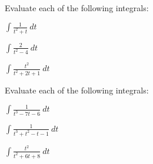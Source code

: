 \begin{problem}
  
\item Evaluate each of the following integrals:

  \begin{subproblem}
  \item $\int \frac{1}{t^2+t} ~ dt$
    \vfill
  \item $\int \frac{2}{t^2-4} ~ dt$
    \vfill
  \item $\int \frac{t^2}{t^2+2t+1} ~ dt$
    \vfill
  \end{subproblem}


  \clearpage
\item Evaluate each of the following integrals:
    
  \begin{subproblem}
  \item $\int \frac{1}{t^3-7t-6} ~ dt$
    \vfill
  \item $\int \frac{1}{t^3+t^2-t-1} ~ dt$
    \vfill
  \item $\int \frac{t^2}{t^2+6t+8} ~ dt$
    \vfill
  \end{subproblem}


\end{problem}
